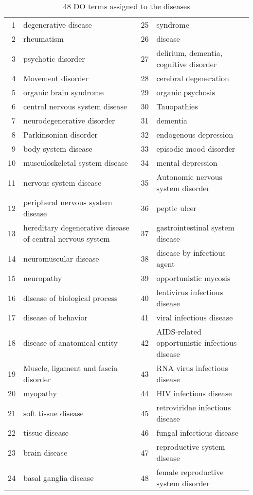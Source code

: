 \documentclass[preprint,11pt]{elsarticle}
\begin{document}
\begin{table}[h]
\centering \scriptsize \caption{48 DO terms assigned to the diseases}\label{doterms}
\begin{tabular}{rlrl}
  \hline
 & &  \\ 
  \hline
1 & degenerative disease & 25 & syndrome \\ 
  2 & rheumatism & 26  &disease \\ 
  3 & psychotic disorder & 27 &delirium, dementia, cognitive disorder \\ 
  4 & Movement disorder & 28&cerebral degeneration \\ 
  5 & organic brain syndrome & 29&organic psychosis \\ 
  6 & central nervous system disease & 30& Tauopathies \\ 
  7 & neurodegenerative disorder & 31&dementia \\ 
  8 & Parkinsonian disorder & 32&endogenous depression \\ 
  9 & body system disease & 33&episodic mood disorder \\ 
  10 & musculoskeletal system disease & 34&mental depression \\ 
  11 & nervous system disease &35& Autonomic nervous system disorder \\ 
  12 & peripheral nervous system disease & 36&peptic ulcer \\ 
  13 & hereditary degenerative disease of central nervous system & 37&gastrointestinal system disease \\ 
  14 & neuromuscular disease & 38&disease by infectious agent \\ 
  15 & neuropathy & 39&opportunistic mycosis \\ 
  16 & disease of biological process & 40&lentivirus infectious disease \\ 
  17 & disease of behavior & 41&viral infectious disease \\ 
  18 & disease of anatomical entity & 42&AIDS-related opportunistic infectious disease \\ 
  19 & Muscle, ligament and fascia disorder & 43&RNA virus infectious disease \\ 
  20 & myopathy & 44&HIV infectious disease \\ 
  21 & soft tissue disease & 45&retroviridae infectious disease \\ 
  22 & tissue disease & 46&fungal infectious disease \\ 
  23 & brain disease & 47&reproductive system disease \\ 
  24 & basal ganglia disease & 48&female reproductive system disorder \\ 
   \hline
\end{tabular}
\end{table}
\normalsize
\end{document}
